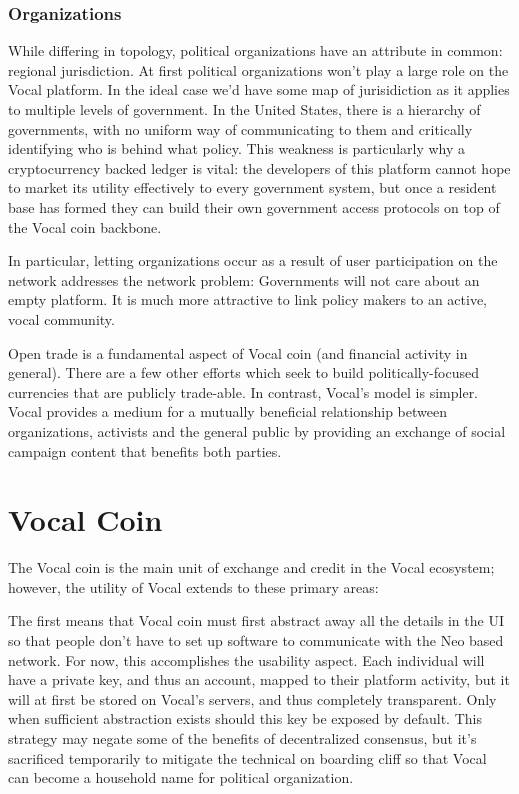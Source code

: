 \documentclass[conference]{IEEEtran}
\begin{document}
    \subsubsection{Organizations}
    While differing in topology, political organizations have an attribute in common: regional jurisdiction. At first political organizations won't play a large role on the Vocal platform. In the ideal case we'd have some map of jurisidiction as it applies to multiple levels of government. In the United States, there is a hierarchy of governments, with no uniform way of communicating to them and critically identifying who is behind what policy. This weakness is particularly why a cryptocurrency backed ledger is vital: the developers of this platform cannot hope to market its utility effectively to every government system, but once a resident base has formed they can build their own government access protocols on top of the Vocal coin backbone.

    In particular, letting organizations occur as a result of user participation on the network addresses the network problem: Governments will not care about an empty platform. It is much more attractive to link policy makers to an active, vocal community. 

    Open trade is a fundamental aspect of Vocal coin (and financial activity in general). There are a few other efforts which seek to build politically-focused currencies that are publicly trade-able. In contrast, Vocal's model is simpler. Vocal provides a medium for a mutually beneficial relationship between organizations, activists and the general public by providing an exchange of social campaign content that benefits both parties.

    \section{Vocal Coin}

    The Vocal coin is the main unit of exchange and credit in the Vocal ecosystem; however, the utility of Vocal extends to these primary areas:

    The first means that Vocal coin must first abstract away all the details in the UI so that people don't have to set up software to communicate with the Neo based network. For now, this accomplishes the usability aspect. Each individual will have a private key, and thus an account, mapped to their platform activity, but it will at first be stored on Vocal's servers, and thus completely transparent. Only when sufficient abstraction exists should this key be exposed by default. This strategy may negate some of the benefits of decentralized consensus, but it's sacrificed temporarily to mitigate the technical on boarding cliff so that Vocal can become a household name for political organization.
\end{document}
